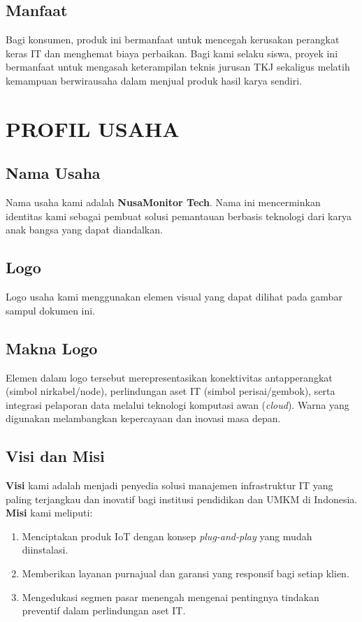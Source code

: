 \documentclass[12pt, a4paper]{article}
\begin{document}
\subsection{Manfaat}
Bagi konsumen, produk ini bermanfaat untuk mencegah kerusakan perangkat keras IT dan menghemat biaya perbaikan. Bagi kami selaku siswa, proyek ini bermanfaat untuk mengasah keterampilan teknis jurusan TKJ sekaligus melatih kemampuan berwirausaha dalam menjual produk hasil karya sendiri.

\section{PROFIL USAHA}

\subsection{Nama Usaha}
Nama usaha kami adalah \textbf{NusaMonitor Tech}. Nama ini mencerminkan identitas kami sebagai pembuat solusi pemantauan berbasis teknologi dari karya anak bangsa yang dapat diandalkan.

\subsection{Logo}
Logo usaha kami menggunakan elemen visual yang dapat dilihat pada gambar sampul dokumen ini. 

\subsection{Makna Logo}
Elemen dalam logo tersebut merepresentasikan konektivitas antapperangkat (simbol nirkabel/node), perlindungan aset IT (simbol perisai/gembok), serta integrasi pelaporan data melalui teknologi komputasi awan (\textit{cloud}). Warna yang digunakan melambangkan kepercayaan dan inovasi masa depan.

\subsection{Visi dan Misi}
\textbf{Visi} kami adalah menjadi penyedia solusi manajemen infrastruktur IT yang paling terjangkau dan inovatif bagi institusi pendidikan dan UMKM di Indonesia. \\
\textbf{Misi} kami meliputi:
\begin{enumerate}
    \item Menciptakan produk IoT dengan konsep \textit{plug-and-play} yang mudah diinstalasi.
    \item Memberikan layanan purnajual dan garansi yang responsif bagi setiap klien.
    \item Mengedukasi segmen pasar menengah mengenai pentingnya tindakan preventif dalam perlindungan aset IT.
\end{enumerate}
\end{document}
